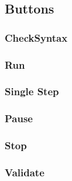 \subsection{Buttons}
\subsubsection{CheckSyntax}
\subsubsection{Run}
\subsubsection{Single Step}
\subsubsection{Pause}
\subsubsection{Stop}
\subsubsection{Validate}